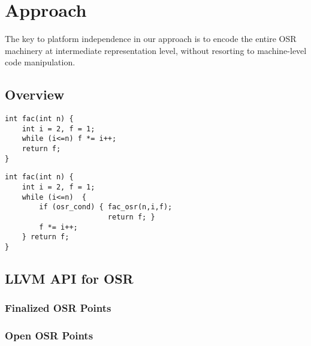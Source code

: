 \section{Approach}
\label{se:approach}

The key to platform independence in our approach is to encode the entire OSR machinery at intermediate representation level, without resorting to machine-level code manipulation.

\subsection{Overview}

\begin{verbatim}
int fac(int n) {
    int i = 2, f = 1;
    while (i<=n) f *= i++;
    return f;
}
\end{verbatim}

\begin{verbatim}
int fac(int n) {
    int i = 2, f = 1;
    while (i<=n)  {
        if (osr_cond) { fac_osr(n,i,f); 
                        return f; }
        f *= i++; 
    } return f;
}
\end{verbatim}

\subsection{LLVM API for OSR}

\subsubsection{Finalized OSR Points}

\subsubsection{Open OSR Points}


  
  
  
  
  
  
  
  
  
  